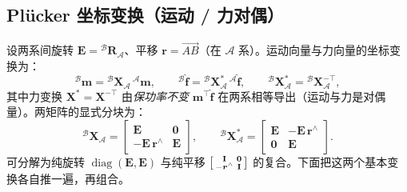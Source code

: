 \subsection{Plücker 坐标变换（运动 / 力对偶）}
\label{subsec:qk-plucker-transform}

设两系间旋转 $\mathbf{E}={}^{\mathcal{B}}\mathbf{R}_{\mathcal{A}}$、平移 $\boldsymbol{r}=\overrightarrow{AB}$（在 $\mathcal{A}$ 系）。运动向量与力向量的坐标变换为\cite{yu2021quadruped}：
\begin{equation}
  {}^{\mathcal{B}}\boldsymbol{m}={}^{\mathcal{B}}\mathbf{X}_{\mathcal{A}}\,{}^{\mathcal{A}}\boldsymbol{m},
  \qquad
  {}^{\mathcal{B}}\hat{\boldsymbol{f}}={}^{\mathcal{B}}\mathbf{X}_{\mathcal{A}}^{*}\,{}^{\mathcal{A}}\hat{\boldsymbol{f}},
  \qquad
  {}^{\mathcal{B}}\mathbf{X}_{\mathcal{A}}^{*}={}^{\mathcal{B}}\mathbf{X}_{\mathcal{A}}^{-\top},
  \label{eq:qk-plucker-X}
\end{equation}
其中力变换 $\mathbf{X}^{*}=\mathbf{X}^{-\top}$ 由\emph{保功率不变} $\boldsymbol{m}^\top\hat{\boldsymbol{f}}$ 在两系相等导出（运动与力是对偶量）。两矩阵的显式分块为\cite{yu2021quadruped}：
\begin{equation}
  {}^{\mathcal{B}}\mathbf{X}_{\mathcal{A}}=\begin{bmatrix}\mathbf{E}&\mathbf{0}\\-\mathbf{E}\,\boldsymbol{r}^{\wedge}&\mathbf{E}\end{bmatrix},
  \qquad
  {}^{\mathcal{B}}\mathbf{X}_{\mathcal{A}}^{*}=\begin{bmatrix}\mathbf{E}&-\mathbf{E}\,\boldsymbol{r}^{\wedge}\\\mathbf{0}&\mathbf{E}\end{bmatrix}.
  \label{eq:qk-plucker-X-block}
\end{equation}
可分解为纯旋转 $\operatorname{diag}(\mathbf{E},\mathbf{E})$ 与纯平移 $\begin{bsmallmatrix}\mathbf{I}&\mathbf{0}\\-\boldsymbol{r}^{\wedge}&\mathbf{I}\end{bsmallmatrix}$ 的复合\cite{yu2021quadruped}。下面把这两个基本变换各自推一遍，再组合。

